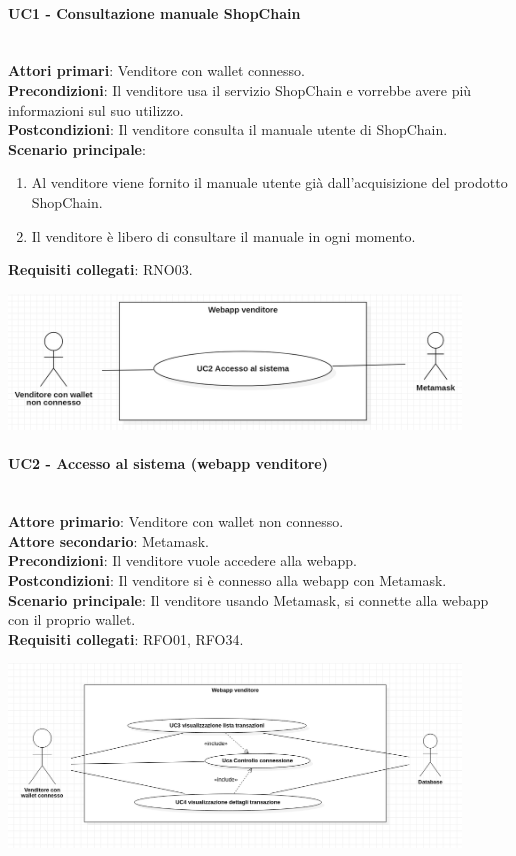 \documentclass[a4paper, 12pt]{article}
\begin{document}
\paragraph{UC1 - Consultazione manuale ShopChain}\\
\textbf{Attori primari}: Venditore con wallet connesso.\\
\textbf{Precondizioni}: Il venditore usa il servizio ShopChain e vorrebbe avere più informazioni sul suo utilizzo.\\
\textbf{Postcondizioni}: Il venditore consulta il manuale utente di ShopChain.\\
\textbf{Scenario principale}:
\begin{enumerate}
\item Al venditore viene fornito il manuale utente già dall'acquisizione del prodotto ShopChain.
\item Il venditore è libero di consultare il manuale in ogni momento.
\end{enumerate}
\textbf{Requisiti collegati}: RNO03.

\includegraphics[width=0.9\textwidth]{UC_WAV2}

\paragraph{UC2 - Accesso al sistema (webapp venditore)}\\
\textbf{Attore primario}: Venditore con wallet non connesso.\\
\textbf{Attore secondario}: Metamask.\\
\textbf{Precondizioni}: Il venditore vuole accedere alla webapp.\\
\textbf{Postcondizioni}: Il venditore si è connesso alla webapp con Metamask.\\
\textbf{Scenario principale}:
Il venditore usando Metamask, si connette alla webapp con il proprio wallet.\\
\textbf{Requisiti collegati}: RFO01, RFO34.

\includegraphics[width=0.9\textwidth]{UC_WAV3}
\end{document}
